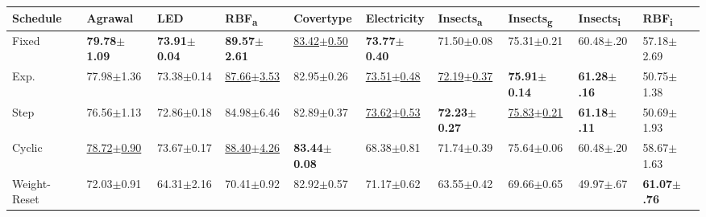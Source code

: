 \documentclass{article} %
\begin{document}
\begin{center}
   \begin{sideways}
      \begin{minipage}{0.9\textheight}
         \small
         \centering
         \begin{tabular}{llllllllll}
            \toprule
            Schedule                  & Agrawal                    & LED                      & RBF\textsubscript{a}       & Covertype                  & Electricity                & Insects\textsubscript{a}   & Insects\textsubscript{g}   & Insects\textsubscript{i} & RBF\textsubscript{i}    \\ \midrule
            Fixed                     & \bfseries 79.78$\pm$1.09   & \bfseries 73.91$\pm$0.04 & \bfseries 89.57$\pm$2.61   & \underline{83.42$\pm$0.50} & \bfseries 73.77$\pm$0.40   & 71.50$\pm$0.08             & 75.31$\pm$0.21             & 60.48$\pm$.20            & 57.18$\pm$2.69          \\
            Exp.                      & 77.98$\pm$1.36             & 73.38$\pm$0.14           & \underline{87.66$\pm$3.53} & 82.95$\pm$0.26             & \underline{73.51$\pm$0.48} & \underline{72.19$\pm$0.37} & \bfseries 75.91$\pm$0.14   & \bfseries 61.28$\pm$.16  & 50.75$\pm$1.38          \\
            Step                      & 76.56$\pm$1.13             & 72.86$\pm$0.18           & 84.98$\pm$6.46             & 82.89$\pm$0.37             & \underline{73.62$\pm$0.53} & \bfseries 72.23$\pm$0.27   & \underline{75.83$\pm$0.21} & \bfseries 61.18$\pm$.11  & 50.69$\pm$1.93          \\
            Cyclic                    & \underline{78.72$\pm$0.90} & 73.67$\pm$0.17           & \underline{88.40$\pm$4.26} & \bfseries 83.44$\pm$0.08   & 68.38$\pm$0.81             & 71.74$\pm$0.39             & 75.64$\pm$0.06             & 60.48$\pm$.20            & 58.67$\pm$1.63          \\
            Weight-Reset              & 72.03$\pm$0.91             & 64.31$\pm$2.16           & 70.41$\pm$0.92             & 82.92$\pm$0.57             & 71.17$\pm$0.62             & 63.55$\pm$0.42             & 69.66$\pm$0.65             & 49.97$\pm$.67            & \bfseries 61.07$\pm$.76 \\

\end{tabular}
\end{minipage}
\end{sideways}
\end{center}
\end{document}

